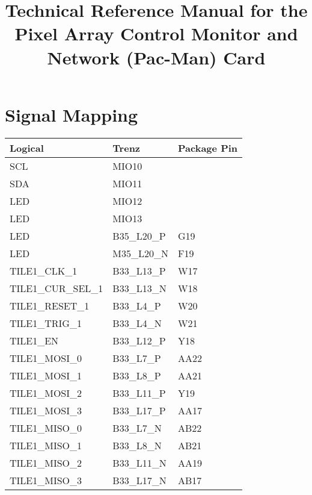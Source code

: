 \documentclass[12pt]{article}
\begin{document}

\title{Technical Reference Manual for the Pixel Array Control Monitor and Network (Pac-Man) Card}

\maketitle

\section{Signal Mapping}

\begin{tabular}{lll}
\hline
Logical & Trenz & Package Pin \\  
\hline
SCL         & MIO10        & \\
SDA         & MIO11        & \\
LED         & MIO12        & \\
LED         & MIO13        & \\
LED         & B35\_L20\_P  & G19 \\
LED         & M35\_L20\_N  & F19 \\
\hline
TILE1\_CLK\_1      & B33\_L13\_P  & W17\\
TILE1\_CUR\_SEL\_1 & B33\_L13\_N  & W18\\
TILE1\_RESET\_1    & B33\_L4\_P   & W20\\
TILE1\_TRIG\_1     & B33\_L4\_N   & W21\\
TILE1\_EN          & B33\_L12\_P  & Y18\\
TILE1\_MOSI\_0     & B33\_L7\_P   & AA22\\
TILE1\_MOSI\_1     & B33\_L8\_P   & AA21\\
TILE1\_MOSI\_2     & B33\_L11\_P  & Y19\\
TILE1\_MOSI\_3     & B33\_L17\_P  & AA17\\
TILE1\_MISO\_0     & B33\_L7\_N   & AB22\\
TILE1\_MISO\_1     & B33\_L8\_N   & AB21\\
TILE1\_MISO\_2     & B33\_L11\_N  & AA19\\
TILE1\_MISO\_3     & B33\_L17\_N  & AB17\\
\hline
\end{tabular}
\end{document}
